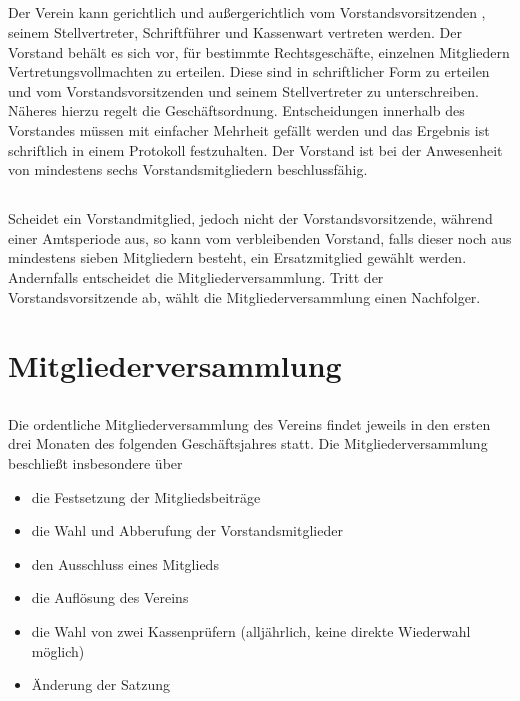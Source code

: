 	\subsection {} Der Verein kann gerichtlich und außergerichtlich vom Vorstandsvorsitzenden , seinem Stellvertreter, Schriftführer und Kassenwart vertreten werden. Der Vorstand behält es sich vor, für bestimmte Rechtsgeschäfte, einzelnen Mitgliedern Vertretungsvollmachten zu erteilen. Diese sind in schriftlicher Form zu erteilen und vom Vorstandsvorsitzenden und seinem Stellvertreter zu unterschreiben. Näheres hierzu regelt die Geschäftsordnung. 
	Entscheidungen innerhalb des Vorstandes müssen mit einfacher Mehrheit gefällt werden und das Ergebnis ist schriftlich in einem Protokoll festzuhalten. Der Vorstand ist bei der Anwesenheit von mindestens sechs Vorstandsmitgliedern beschlussfähig. 
	
	\subsection {} Scheidet ein Vorstandmitglied, jedoch nicht der Vorstandsvorsitzende, während einer Amtsperiode aus, so kann vom verbleibenden Vorstand, falls dieser noch aus mindestens sieben Mitgliedern besteht, ein Ersatzmitglied gewählt werden. Andernfalls entscheidet die Mitgliederversammlung. Tritt der Vorstandsvorsitzende ab, wählt die Mitgliederversammlung einen Nachfolger. 

\section{Mitgliederversammlung}
	\subsection{} Die ordentliche Mitgliederversammlung des Vereins findet jeweils in den ersten drei Monaten des folgenden Geschäftsjahres statt. Die Mitgliederversammlung beschließt insbesondere über
	
	\begin{itemize}
		\item die Festsetzung der Mitgliedsbeiträge 
		\item die Wahl und Abberufung der Vorstandsmitglieder
		\item den Ausschluss eines Mitglieds
		\item die Auflösung des Vereins
		\item die Wahl von zwei Kassenprüfern (alljährlich, keine direkte Wiederwahl möglich)
		\item Änderung der Satzung  
	\end{itemize} 

